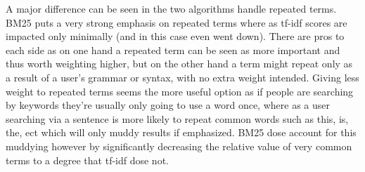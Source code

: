 \documentclass[12pt, letterpaper]{article}
\begin{document}
A major difference can be seen in the two algorithms handle repeated terms. BM25 puts a very strong emphasis on repeated terms where as tf-idf scores are impacted only minimally (and in this case even went down). There are pros to each side as on one hand a repeated term can be seen as more important and thus worth weighting higher, but on the other hand a term might repeat only as a result of a user's grammar or syntax, with no extra weight intended. Giving less weight to repeated terms seems the more useful option as if people are searching by keywords they're usually only going to use a word once, where as a user searching via a sentence is more likely to repeat common words such as this, is, the, ect which will only muddy results if emphasized. BM25 dose account for this muddying however by significantly decreasing the relative value of very common terms to a degree that tf-idf dose not.
\end{document}
